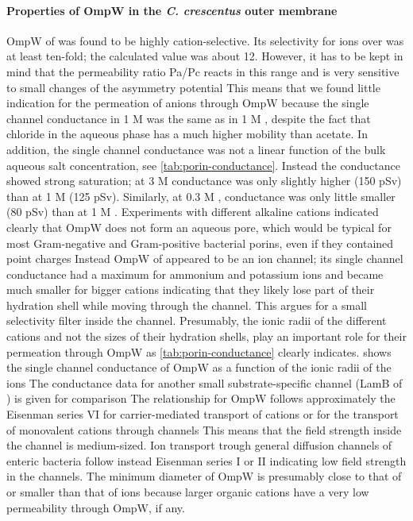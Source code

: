 \paragraph{Properties of OmpW in the \textit{C. crescentus} outer membrane}
OmpW of \caulobacter was found to be highly cation-selective. Its selectivity for  ions over  was at least ten-fold; the calculated value was about 12. However, it has to be kept in mind that the permeability ratio Pa/Pc reacts in this range and is very sensitive to small changes of the asymmetry potential This means that we found little indication for the permeation of anions through OmpW because the single channel conductance in 1 M  was the same as in 1 M , despite the fact that chloride in the aqueous phase has a much higher mobility than acetate. In addition, the single channel conductance was not a linear function of the bulk aqueous salt concentration, see \cref{tab:porin-conductance}. Instead the conductance showed strong saturation; at 3 M  conductance was only slightly higher (150 \si{\pico\sievert}) than at 1 M  (125 \si{\pico\sievert}). Similarly, at 0.3 M , conductance was only little smaller (80 \si{\pico\sievert}) than at 1 M . Experiments with different alkaline cations indicated clearly that OmpW does not form an aqueous pore, which would be typical for most Gram-negative and Gram-positive bacterial porins, even if they contained point charges Instead OmpW of \caulobacter appeared to be an ion channel; its single channel conductance had a maximum for ammonium and potassium ions and became much smaller for bigger cations indicating that they likely lose part of their hydration shell while moving through the channel. This argues for a small selectivity filter inside the channel. Presumably, the ionic radii of the different cations and not the sizes of their hydration shells, play an important role for their permeation through OmpW as \cref{tab:porin-conductance} clearly indicates.  shows the single channel conductance of OmpW as a function of the ionic radii of the ions The conductance data for another small substrate-specific channel (LamB of \ecoli) is given for comparison The relationship for OmpW follows approximately the Eisenman series VI for carrier-mediated transport of cations or for the transport of monovalent cations through channels This means that the field strength inside the channel is medium-sized. Ion transport trough general diffusion channels of enteric bacteria follow instead Eisenman series I or II indicating low field strength in the channels. The minimum diameter of OmpW is presumably close to that of  or smaller than that of  ions because larger organic cations have a very low permeability through OmpW, if any. 

